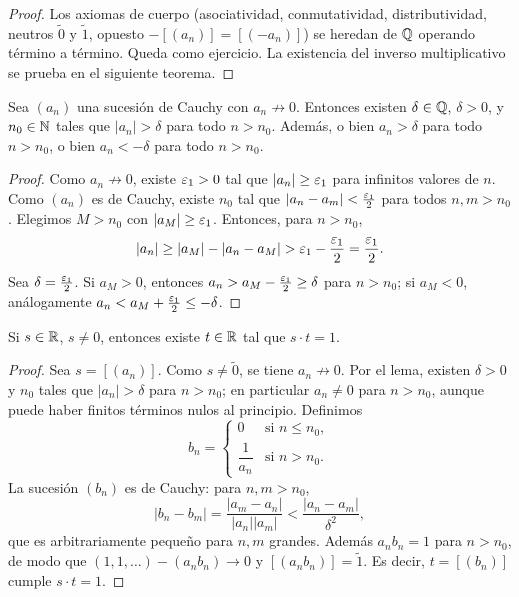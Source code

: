 \begin{proof}
  Los axiomas de cuerpo (asociatividad, conmutatividad, distributividad, neutros \(\tilde{0}\) y \(\tilde{1}\), opuesto \(-[(a_n)] = [(-a_n)]\)) se heredan de \(\mathbb{Q}\) operando término a término. Queda como ejercicio. La existencia del inverso multiplicativo se prueba en el siguiente teorema.
\end{proof}

\begin{lemma}
  Sea \((a_n)\) una sucesión de Cauchy con \(a_n \not\to 0\). Entonces existen \(\delta \in \mathbb{Q}\), \(\delta > 0\), y \(n_0 \in \mathbb{N}\) tales que \(|a_n| > \delta\) para todo \(n > n_0\). Además, o bien \(a_n > \delta\) para todo \(n > n_0\), o bien \(a_n < -\delta\) para todo \(n > n_0\).
\end{lemma}

\begin{proof}
  Como \(a_n \not\to 0\), existe \(\varepsilon_1 > 0\) tal que \(|a_n| \geq \varepsilon_1\) para infinitos valores de \(n\). Como \((a_n)\) es de Cauchy, existe \(n_0\) tal que \(|a_n - a_m| < \frac{\varepsilon_1}{2}\) para todos \(n, m > n_0\). Elegimos \(M > n_0\) con \(|a_M| \geq \varepsilon_1\). Entonces, para \(n > n_0\),
  \[
    |a_n| \geq |a_M| - |a_n - a_M| > \varepsilon_1 - \frac{\varepsilon_1}{2} = \frac{\varepsilon_1}{2}.
  \]
  Sea \(\delta = \frac{\varepsilon_1}{2}\). Si \(a_M > 0\), entonces \(a_n > a_M - \frac{\varepsilon_1}{2} \geq \delta\) para \(n > n_0\); si \(a_M < 0\), análogamente \(a_n < a_M + \frac{\varepsilon_1}{2} \leq -\delta\).
\end{proof}

\begin{theorem}
  Si \(s \in \mathbb{R}\), \(s \neq 0\), entonces existe \(t \in \mathbb{R}\) tal que \(s \cdot t = 1\).
\end{theorem}

\begin{proof}
  Sea \(s = [(a_n)]\). Como \(s \neq \tilde{0}\), se tiene \(a_n \not\to 0\). Por el lema, existen \(\delta > 0\) y \(n_0\) tales que \(|a_n| > \delta\) para \(n > n_0\); en particular \(a_n \neq 0\) para \(n > n_0\), aunque puede haber finitos términos nulos al principio. Definimos
  \[
    b_n =
    \begin{cases}
      0              & \text{si } n \leq n_0, \\
      \dfrac{1}{a_n} & \text{si } n > n_0.
    \end{cases}
  \]
  La sucesión \((b_n)\) es de Cauchy: para \(n, m > n_0\),
  \[
    |b_n - b_m| = \frac{|a_m - a_n|}{|a_n| |a_m|} < \frac{|a_n - a_m|}{\delta^2},
  \]
  que es arbitrariamente pequeño para \(n, m\) grandes. Además \(a_n b_n = 1\) para \(n > n_0\), de modo que \((1, 1, \dots) - (a_n b_n) \to 0\) y \([(a_n b_n)] = \tilde{1}\). Es decir, \(t = [(b_n)]\) cumple \(s \cdot t = 1\).
\end{proof}

